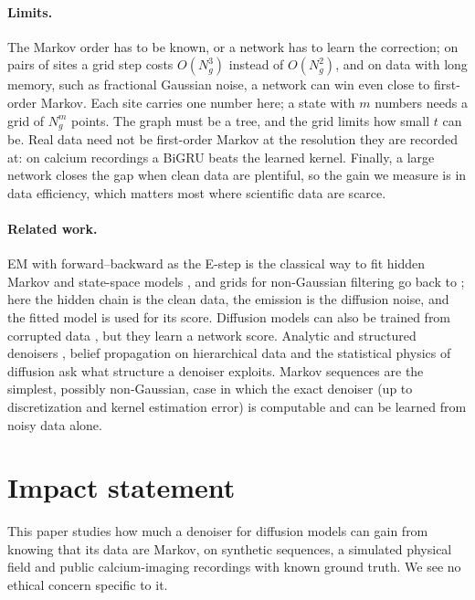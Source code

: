 \documentclass{article}
\begin{document}
\paragraph{Limits.} The Markov order has to be known, or a network has to learn the correction; on pairs of sites a
grid step costs $O(N_g^3)$ instead of $O(N_g^2)$, and on data with long memory, such as fractional Gaussian noise, a
network can win even close to first-order Markov. Each site carries one number here; a state with $m$ numbers needs a
grid of $N_g^m$ points. The graph must be a tree, and the grid limits how small $t$ can be. Real data need not be
first-order Markov at the resolution they are recorded at: on calcium recordings a BiGRU beats the learned kernel.
Finally, a large network closes the gap when clean data are plentiful, so the gain we measure is in data efficiency,
which matters most where scientific data are scarce.

\paragraph{Related work.} EM with forward--backward as the E-step is the classical way to fit hidden Markov and
state-space models \cite{baum1970,rabiner1989tutorial,shumway1982em,cappe2005}, and grids for non-Gaussian filtering go
back to \cite{kitagawa1987}; here the hidden chain is the clean data, the emission is the diffusion noise, and the
fitted model is used for its score. Diffusion models can also be trained from corrupted data
\cite{daras2023ambient,rozet2024learning,bai2024em}, but they learn a network score. Analytic and structured denoisers
\cite{kamb2024analytic,kadkhodaie2024generalization}, belief propagation on hierarchical data
\cite{garnierbrun2024transformers,sclocchi2025phase,mei2024unets} and the statistical physics of diffusion
\cite{biroli2023generative,biroli2024dynamical,achilli2025memorization,bonnaire2025memorize,garnierbrun2026biased,garnierbrun2026foam}
ask what structure a denoiser exploits. Markov sequences are the simplest, possibly non-Gaussian, case in which the
exact denoiser (up to discretization and kernel estimation error) is computable and can be learned from noisy data alone.

\section*{Impact statement}
This paper studies how much a denoiser for diffusion models can gain from knowing that its data are Markov, on
synthetic sequences, a simulated physical field and public calcium-imaging recordings with known ground truth. We see
no ethical concern specific to it.
\end{document}
